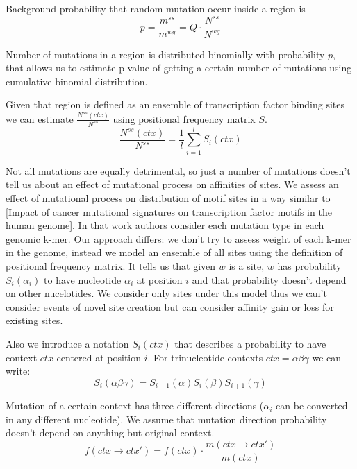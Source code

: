 \documentclass[a4paper]{article}
\begin{document}
Background probability that random mutation occur inside a region is
\begin{equation}
	p = \frac{ m^{ss} }{ m^{wg} } = Q\cdot\frac{N^{ss}}{N^{wg}}
\end{equation}

Number of mutations in a region is distributed binomially with probability $p$, that allows us to estimate p-value of getting a certain number of mutations using cumulative binomial distribution.

Given that region is defined as an ensemble of transcription factor binding sites we can estimate $\frac{N^{ss}(ctx)}{N^{ss}}$ using positional frequency matrix $S$.
\begin{equation}
	 \frac{N^{ss}(ctx)}{N^{ss}} = \frac{1}{l}\sum_{i=1}^l S_i(ctx)
\end{equation}

Not all mutations are equally detrimental, so just a number of mutations doesn't tell us about an effect of mutational process on affinities of sites. We assess an effect of mutational process on distribution of motif sites in a way similar to [Impact of cancer mutational signatures on transcription factor motifs in the human genome]. In that work authors consider each mutation type in each genomic k-mer. Our approach differs: we don't try to assess weight of each k-mer in the genome, instead we model an ensemble of all sites using the definition of positional frequency matrix. It tells us that given $w$ is a site, $w$ has probability $S_i(\alpha_i)$ to have nucleotide $\alpha_i$ at position $i$ and that probability doesn't depend on other nucelotides.
We consider only sites under this model thus we can't consider events of novel site creation but can consider affinity gain or loss for existing sites.

Also we introduce a notation $S_i(ctx)$ that describes a probability to have context $ctx$ centered at position $i$. For trinucleotide contexts $ctx=\alpha\beta\gamma$ we can write:
\begin{equation}
	S_i(\alpha\beta\gamma) = S_{i-1}(\alpha)S_i(\beta)S_{i+1}(\gamma)
\end{equation} 


Mutation of a certain context has three different directions ($\alpha_i$ can be converted in any different nucleotide). We assume that mutation direction probability doesn't depend on anything but original context.
\begin{equation}
	f(ctx\to ctx') = f(ctx) \cdot \frac{m(ctx\to ctx')}{m(ctx)}
\end{equation}
\end{document}

